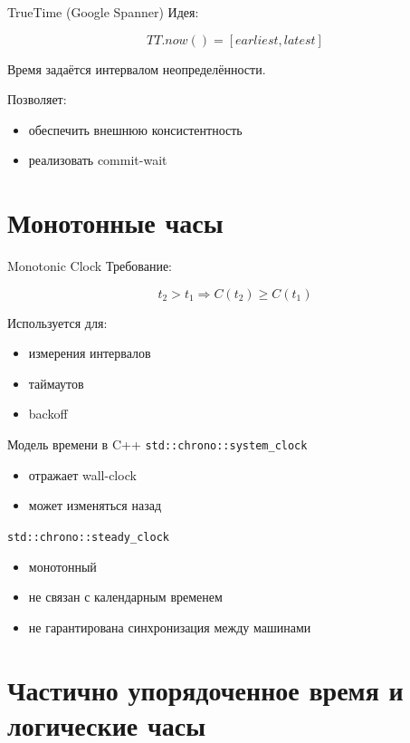\documentclass{beamer}
\begin{document}
\begin{frame}{TrueTime (Google Spanner)}
Идея:

\[
TT.now() = [earliest, latest]
\]

Время задаётся интервалом неопределённости.

Позволяет:
\begin{itemize}
\item обеспечить внешнюю консистентность
\item реализовать commit-wait
\end{itemize}
\end{frame}

\section{Монотонные часы}

\begin{frame}{Monotonic Clock}
Требование:

\[
t_2 > t_1 \Rightarrow C(t_2) \ge C(t_1)
\]


Используется для:
\begin{itemize}
\item измерения интервалов
\item таймаутов
\item backoff
\end{itemize}
\end{frame}


\begin{frame}{Модель времени в C++}
\texttt{std::chrono::system\_clock}
\begin{itemize}
\item отражает wall-clock
\item может изменяться назад
\end{itemize}


\texttt{std::chrono::steady\_clock}
\begin{itemize}
\item монотонный
\item не связан с календарным временем
\item не гарантирована синхронизация между машинами
\end{itemize}
\end{frame}

\section{Частично упорядоченное время и логические часы}
\end{document}
